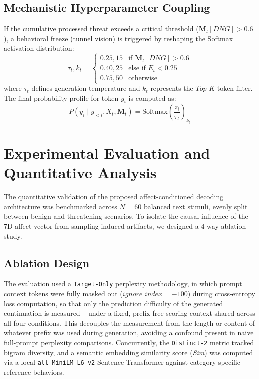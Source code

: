 \documentclass[10pt,twocolumn]{article}
\begin{document}
\subsection{Mechanistic Hyperparameter Coupling}
If the cumulative processed threat exceeds a critical threshold ($\mathbf{M}_t[DNG] > 0.6$), a behavioral freeze (tunnel vision) is triggered by reshaping the Softmax activation distribution:
\begin{equation}
\tau_t, k_t = \begin{cases}
0.25, 15 & \text{if } \mathbf{M}_t[DNG] > 0.6 \\
0.40, 25 & \text{else if } E_t < 0.25 \\
0.75, 50 & \text{otherwise}
\end{cases}
\end{equation}
where $\tau_t$ defines generation temperature and $k_t$ represents the $Top\text{-}K$ token filter. The final probability profile for token $y_i$ is computed as:
\begin{equation}
P(y_i \mid y_{<i}, X_t, \mathbf{M}_t) = \text{Softmax}\left( \frac{z_i}{\tau_t} \right)_{k_t}
\end{equation}


\section{Experimental Evaluation and Quantitative Analysis}
The quantitative validation of the proposed affect-conditioned decoding architecture was benchmarked across $N=60$ balanced text stimuli, evenly split between benign and threatening scenarios. To isolate the causal influence of the 7D affect vector from sampling-induced artifacts, we designed a 4-way ablation study.

\subsection{Ablation Design}
The evaluation used a \texttt{Target-Only} perplexity methodology, in which prompt context tokens were fully masked out ($ignore\_index = -100$) during cross-entropy loss computation, so that only the prediction difficulty of the generated continuation is measured -- under a fixed, prefix-free scoring context shared across all four conditions. This decouples the measurement from the length or content of whatever prefix was used during generation, avoiding a confound present in naive full-prompt perplexity comparisons. Concurrently, the \texttt{Distinct-2} metric tracked bigram diversity, and a semantic embedding similarity score (\textit{Sim}) was computed via a local \texttt{all-MiniLM-L6-v2} Sentence-Transformer against category-specific reference behaviors.
\end{document}
